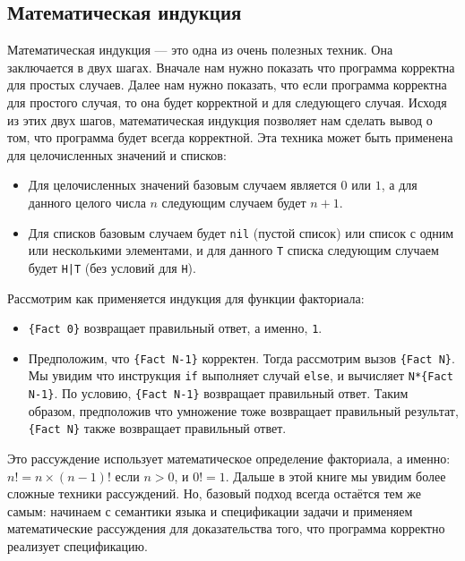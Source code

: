 \subsection{Математическая индукция}

Математическая индукция --- это одна из очень полезных техник. Она заключается в двух шагах. Вначале нам нужно показать что программа корректна для простых случаев. Далее нам нужно показать, что если программа корректна для простого случая, то она будет корректной и для следующего случая. Исходя из этих двух шагов, математическая индукция позволяет нам сделать вывод о том, что программа будет всегда корректной. Эта техника может быть применена для целочисленных значений и списков:

\begin{itemize}
\item{Для целочисленных значений базовым случаем является $0$ или $1$, а для данного целого числа $n$ следующим случаем будет $n+1$.}

\item{Для списков базовым случаем будет \lstinline|nil| (пустой список) или список с одним или несколькими элементами, и для данного \lstinline|T| списка следующим случаем будет \lstinline!H|T! (без условий для \lstinline|H|).}
\end{itemize}

Рассмотрим как применяется индукция для функции факториала:

\begin{itemize}

\item{\lstinline|{Fact 0}| возвращает правильный ответ, а именно, \lstinline|1|.}

\item{Предположим, что \lstinline|{Fact N-1}| корректен. Тогда рассмотрим вызов \lstinline|{Fact N}|. Мы увидим что инструкция \lstinline|if| выполняет случай \lstinline|else|, и вычисляет \lstinline|N*{Fact N-1}|. По условию, \lstinline|{Fact N-1}| возвращает правильный ответ. Таким образом, предположив что умножение тоже возвращает правильный результат, \lstinline|{Fact N}| также возвращает правильный ответ.}
\end{itemize}

Это рассуждение использует математическое определение факториала, а именно: $n! = n \times (n - 1)!$ если $n > 0$, и $0! = 1$. Дальше в этой книге мы увидим более сложные техники рассуждений. Но, базовый подход всегда остаётся тем же самым: начинаем с семантики языка и спецификации задачи и применяем математические рассуждения для доказательства того, что программа корректно реализует спецификацию.

